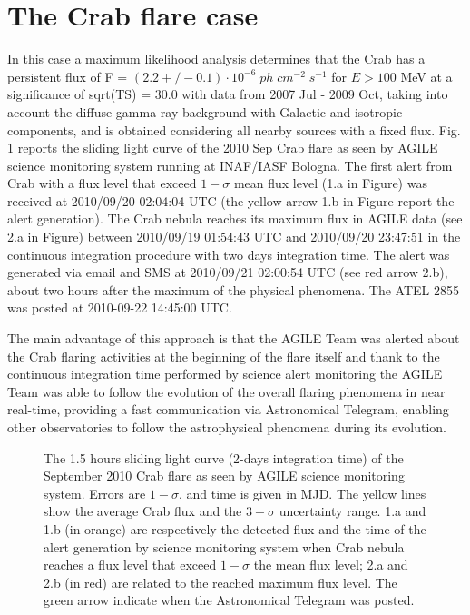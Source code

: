       
\section{The Crab flare case}

In this case a maximum likelihood analysis determines that the Crab has a persistent flux of
F = $(2.2 +/- 0.1) \cdot 10^{-6} \; ph \; cm^{-2} \; s^{-1}$ for $E > 100$ MeV at a significance of sqrt(TS) = 30.0 with data from 2007 Jul - 2009 Oct, taking into account the diffuse gamma-ray background with Galactic and isotropic components, and is obtained considering all nearby sources with a fixed flux. Fig. \ref{fig_crab} reports the sliding light curve of the  2010 Sep Crab flare as seen by AGILE science monitoring system running at INAF/IASF Bologna. 
The first alert  from Crab with a flux level that exceed $1-\sigma$ mean flux level (1.a in Figure) was received at 2010/09/20 02:04:04 UTC (the yellow arrow 1.b in Figure report the alert generation). The Crab nebula reaches its maximum flux in AGILE data (see 2.a in Figure)
      between 2010/09/19 01:54:43 UTC and 2010/09/20 23:47:51
      in the continuous integration procedure with two days integration
      time. The alert was generated via email and SMS at
      2010/09/21 02:00:54 UTC (see red arrow 2.b), about two hours after the maximum of the physical phenomena.  The ATEL 2855 \citep{Tavani:ATEL} was posted at 2010-09-22 14:45:00 UTC.
      
      The main advantage  of this approach is that the AGILE Team was alerted about the Crab flaring activities at the beginning of the flare itself and thank to the continuous integration time performed by science alert monitoring the AGILE Team was able to follow the evolution of the overall flaring phenomena in near real-time, providing a fast communication via Astronomical Telegram, enabling other observatories to follow the astrophysical phenomena during its evolution.
      


\begin{figure}[t]
\caption{The 1.5 hours sliding light curve (2-days integration time) of the September 2010 Crab flare as seen by AGILE science monitoring system. Errors are $1-\sigma$, and time is given in MJD. The yellow lines    show the average Crab flux and the $3-\sigma$ uncertainty range. 1.a and 1.b (in orange) are respectively the detected flux and the time of the alert generation by science monitoring system when Crab nebula reaches a flux level that exceed $1-\sigma$ the mean flux level; 2.a and 2.b (in red) are related to the reached maximum flux level. The green arrow indicate when the Astronomical Telegram was posted.} \label{fig_crab}
\end{figure}

